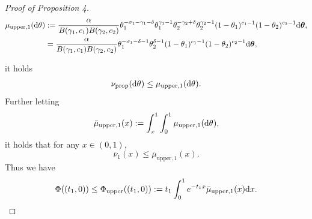 \begin{proof}[Proof of Proposition 4]
\begin{equation}
    \begin{aligned}
        \mu_{\mathrm{upper}, 1}(\de\vecvariantfreq{})&:= 
	\frac{\mass}{B(\corr{1}, \conc{1})B(\corr{2}, \conc{2})}
	\variantfreqperpop{1}^{-\rate{1}-\corr{1}-\smallpositive} \variantfreqperpop{1}^{\corr{1}-1}\variantfreqperpop{2}^{-\corr{2}+\smallpositive}\variantfreqperpop{2}^{\corr{2}-1}(1-\variantfreqperpop{1})^{\conc{1}-1}(1-\variantfreqperpop{2})^{\conc{2}-1} \de \btheta,\\
    &=\frac{\mass}{B(\corr{1}, \conc{1})B(\corr{2}, \conc{2})}
	\variantfreqperpop{1}^{-\rate{1}-\smallpositive-1} \variantfreqperpop{2}^{\smallpositive-1}(1-\variantfreqperpop{1})^{\conc{1}-1}(1-\variantfreqperpop{2})^{\conc{2}-1} \de \btheta,\\
    \end{aligned}
\end{equation}

it holds
\begin{align*}
    \ratemeasproposed(\de\vecvariantfreq{})\le\mu_{\mathrm{upper}, 1}(\de\vecvariantfreq{}).
\end{align*}
Further letting 
\[
	\bar\mu_{\mathrm{upper}, 1}(x):=\int_{x}^1\int_{0}^1 \mu_{\mathrm{upper}, 1}(\de\vecvariantfreq{}),
\]
it holds that for any $x \in (0,1)$,
\[
	\bar\nu_1(x)\le \bar\mu_{\mathrm{upper}, 1} (x).
\]
Thus we have
\begin{align*}
    \Phi((t_1,0))\le \Phi_{\mathrm{upper}}((t_1,0)):= t_1\int_{0}^1 e^{-t_1x} \bar\mu_{\mathrm{upper}, 1}(x) \mathrm{d} x.
\end{align*}


\end{proof}
